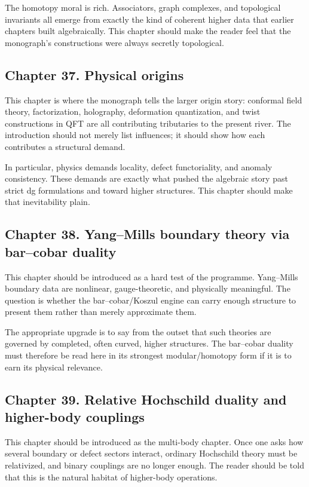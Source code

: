 The homotopy moral is rich.  Associators, graph complexes, and topological invariants all emerge from exactly the kind of coherent higher data that earlier chapters built algebraically.  This chapter should make the reader feel that the monograph's constructions were always secretly topological.

\subsection*{Chapter 37. Physical origins}
This chapter is where the monograph tells the larger origin story: conformal field theory, factorization, holography, deformation quantization, and twist constructions in QFT are all contributing tributaries to the present river.  The introduction should not merely list influences; it should show how each contributes a structural demand.

In particular, physics demands locality, defect functoriality, and anomaly consistency.  These demands are exactly what pushed the algebraic story past strict dg formulations and toward higher structures.  This chapter should make that inevitability plain.

\subsection*{Chapter 38. Yang--Mills boundary theory via bar--cobar duality}
This chapter should be introduced as a hard test of the programme.  Yang--Mills boundary data are nonlinear, gauge-theoretic, and physically meaningful.  The question is whether the bar--cobar/Koszul engine can carry enough structure to present them rather than merely approximate them.

The appropriate upgrade is to say from the outset that such theories are governed by completed, often curved, higher structures.  The bar--cobar duality must therefore be read here in its strongest modular/homotopy form if it is to earn its physical relevance.

\subsection*{Chapter 39. Relative Hochschild duality and higher-body couplings}
This chapter should be introduced as the multi-body chapter.  Once one asks how several boundary or defect sectors interact, ordinary Hochschild theory must be relativized, and binary couplings are no longer enough.  The reader should be told that this is the natural habitat of higher-body operations.

